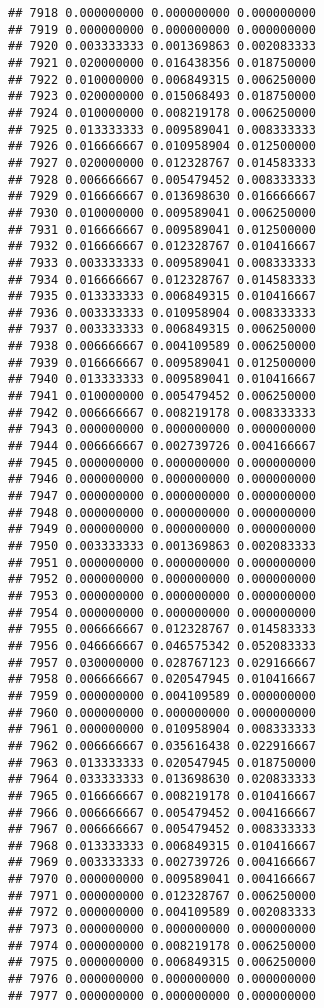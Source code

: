 \documentclass[
]{article}
\begin{document}
\begin{verbatim}
## 7918 0.000000000 0.000000000 0.000000000
## 7919 0.000000000 0.000000000 0.000000000
## 7920 0.003333333 0.001369863 0.002083333
## 7921 0.020000000 0.016438356 0.018750000
## 7922 0.010000000 0.006849315 0.006250000
## 7923 0.020000000 0.015068493 0.018750000
## 7924 0.010000000 0.008219178 0.006250000
## 7925 0.013333333 0.009589041 0.008333333
## 7926 0.016666667 0.010958904 0.012500000
## 7927 0.020000000 0.012328767 0.014583333
## 7928 0.006666667 0.005479452 0.008333333
## 7929 0.016666667 0.013698630 0.016666667
## 7930 0.010000000 0.009589041 0.006250000
## 7931 0.016666667 0.009589041 0.012500000
## 7932 0.016666667 0.012328767 0.010416667
## 7933 0.003333333 0.009589041 0.008333333
## 7934 0.016666667 0.012328767 0.014583333
## 7935 0.013333333 0.006849315 0.010416667
## 7936 0.003333333 0.010958904 0.008333333
## 7937 0.003333333 0.006849315 0.006250000
## 7938 0.006666667 0.004109589 0.006250000
## 7939 0.016666667 0.009589041 0.012500000
## 7940 0.013333333 0.009589041 0.010416667
## 7941 0.010000000 0.005479452 0.006250000
## 7942 0.006666667 0.008219178 0.008333333
## 7943 0.000000000 0.000000000 0.000000000
## 7944 0.006666667 0.002739726 0.004166667
## 7945 0.000000000 0.000000000 0.000000000
## 7946 0.000000000 0.000000000 0.000000000
## 7947 0.000000000 0.000000000 0.000000000
## 7948 0.000000000 0.000000000 0.000000000
## 7949 0.000000000 0.000000000 0.000000000
## 7950 0.003333333 0.001369863 0.002083333
## 7951 0.000000000 0.000000000 0.000000000
## 7952 0.000000000 0.000000000 0.000000000
## 7953 0.000000000 0.000000000 0.000000000
## 7954 0.000000000 0.000000000 0.000000000
## 7955 0.006666667 0.012328767 0.014583333
## 7956 0.046666667 0.046575342 0.052083333
## 7957 0.030000000 0.028767123 0.029166667
## 7958 0.006666667 0.020547945 0.010416667
## 7959 0.000000000 0.004109589 0.000000000
## 7960 0.000000000 0.000000000 0.000000000
## 7961 0.000000000 0.010958904 0.008333333
## 7962 0.006666667 0.035616438 0.022916667
## 7963 0.013333333 0.020547945 0.018750000
## 7964 0.033333333 0.013698630 0.020833333
## 7965 0.016666667 0.008219178 0.010416667
## 7966 0.006666667 0.005479452 0.004166667
## 7967 0.006666667 0.005479452 0.008333333
## 7968 0.013333333 0.006849315 0.010416667
## 7969 0.003333333 0.002739726 0.004166667
## 7970 0.000000000 0.009589041 0.004166667
## 7971 0.000000000 0.012328767 0.006250000
## 7972 0.000000000 0.004109589 0.002083333
## 7973 0.000000000 0.000000000 0.000000000
## 7974 0.000000000 0.008219178 0.006250000
## 7975 0.000000000 0.006849315 0.006250000
## 7976 0.000000000 0.000000000 0.000000000
## 7977 0.000000000 0.000000000 0.000000000

\end{verbatim}
\end{document}
